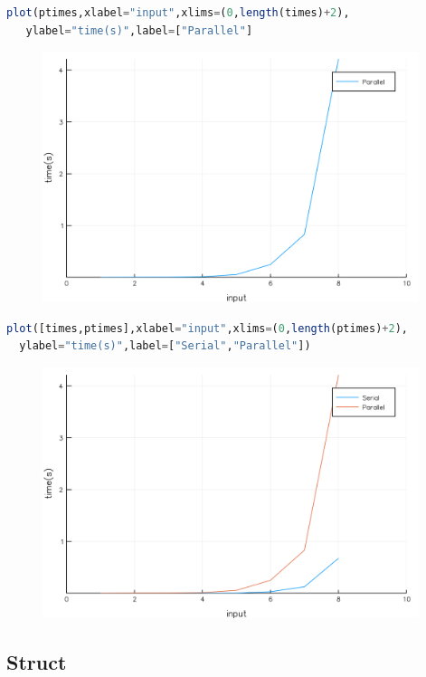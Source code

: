 \documentclass[a4paper,12pt]{article}
\begin{document}
\begin{lstlisting}[language=Julia]
plot(ptimes,xlabel="input",xlims=(0,length(times)+2),
   ylabel="time(s)",label=["Parallel"]
\end{lstlisting}
\begin{figure}[ht!]
\centering
\includegraphics[width=11cm,scale=0.5]{traversalParallel.png}
\end{figure}
\begin{lstlisting}[language=Julia]
plot([times,ptimes],xlabel="input",xlims=(0,length(ptimes)+2),
  ylabel="time(s)",label=["Serial","Parallel"])
\end{lstlisting}
\begin{figure}[ht!]
\centering
\includegraphics[width=11cm,scale=0.5]{traversalC.png}
\end{figure}
\newpage
\subsection{Struct}\label{Struct}
\end{document}
